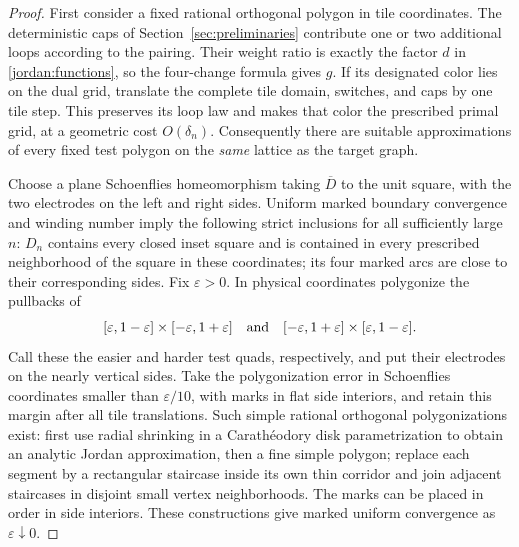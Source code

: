\begin{proof}
First consider a fixed rational orthogonal polygon in tile coordinates.
The deterministic caps of Section~\ref{sec:preliminaries} contribute
one or two additional loops according to the pairing.  Their weight
ratio is exactly the factor $d$ in \eqref{jordan:functions}, so the
four-change formula gives $g$.  If its designated color lies on the
dual grid, translate the complete tile domain, switches, and caps by
one tile step.  This preserves its loop law and makes that color the
prescribed primal grid, at a geometric cost $O(\delta_n)$.  Consequently
there are suitable approximations of every fixed test polygon on the
\emph{same} lattice as the target graph.

Choose a plane Schoenflies homeomorphism taking $\overline D$ to the
unit square, with the two electrodes on the left and right sides.
Uniform marked boundary convergence and winding number imply the
following strict inclusions for all sufficiently large $n$: $D_n$
contains every closed inset square and is contained in every prescribed
neighborhood of the square in these coordinates; its four marked arcs
are close to their corresponding sides.  Fix $\varepsilon>0$.
In physical coordinates polygonize the pullbacks of
\[
 [\varepsilon,1-\varepsilon]\times[-\varepsilon,1+\varepsilon]
 \quad\hbox{and}\quad
 [-\varepsilon,1+\varepsilon]\times[\varepsilon,1-\varepsilon].
\]
Call these the easier and harder test quads, respectively, and put
their electrodes on the nearly vertical sides.  Take the polygonization
error in Schoenflies coordinates smaller than $\varepsilon/10$, with
marks in flat side interiors, and retain this margin after all tile
translations.  Such simple rational orthogonal polygonizations exist:
first use radial shrinking in a Carath\'eodory disk parametrization to
obtain an analytic Jordan approximation, then a fine simple polygon;
replace each segment by a rectangular staircase inside its own thin
corridor and join adjacent staircases in disjoint small vertex
neighborhoods.  The marks can be placed in order in side interiors.
These constructions give marked uniform convergence as
$\varepsilon\downarrow0$.


\end{proof}
